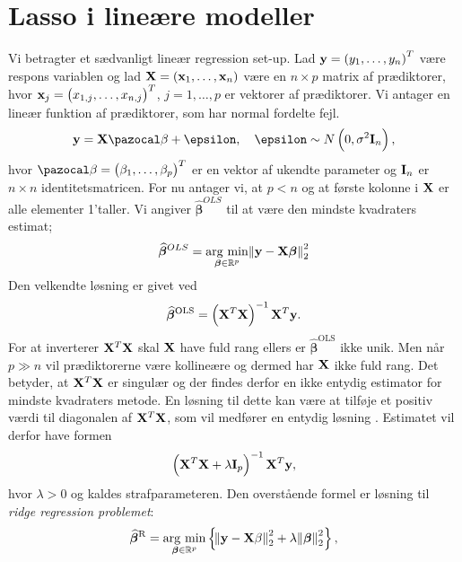 \chapter{Lasso i lineære modeller}
\citep{hastie}

Vi betragter et sædvanligt lineær regression set-up. Lad $\textbf{y} = \del{y_1, \dots, y_n}^T$ være respons variablen og lad $\textbf{X} = \del{\textbf{x}_1, \dots, \textbf{x}_n}$ være en $n \times p$ matrix af prædiktorer, hvor $\textbf{x}_j = \del{x_{1,j}, \dots, x_{n,j}}^T$, $j = 1, \dots, p$ er vektorer af prædiktorer. 
Vi antager en lineær funktion af prædiktorer, som har normal fordelte fejl. 
\begin{align*}
\textbf{y} = \textbf{X} \mathcal{\beta} + \epsilon, \quad \epsilon \sim N \del{0, \sigma^2 \text{\textbf{I}}_n},
\end{align*}
hvor $\mathcal{\beta} = \del{\beta_1, \dots, \beta_p}^T$ er en vektor af ukendte parameter og $\text{\textbf{I}}_n$ er $n \times n$ identitetsmatricen. 
For nu antager vi, at $p<n$ og at første kolonne i $\mathbf{X}$ er alle elementer 1'taller. 
Vi angiver $\widehat{\boldsymbol{\beta}}^{OLS}$ til at være den mindste kvadraters estimat;
\begin{align*}
\widehat{\boldsymbol{\beta}}^{OLS} = \underset{\boldsymbol\beta \in \mathbb{R}^p}{\operatorname*{\arg\,\min}} \norm{ \textbf{y} - \textbf{X}\boldsymbol\beta}^2_2
\end{align*}
Den velkendte løsning er givet ved 
\begin{align*}
\widehat{\boldsymbol\beta}^{\text{OLS}} = \del{\X^T \X}^{-1} \X^T \y.
\end{align*}
For at inverterer $\mathbf{X}^T \mathbf{X}$ skal $\mathbf{X}$ have fuld rang ellers er $\widehat{\boldsymbol\beta}^{\text{OLS}}$ ikke unik. 
Men når  \(p \gg n\) vil prædiktorerne være kollineære og dermed har \(\mathbf{X}\) ikke fuld rang.
Det betyder, at $\mathbf{X}^T \mathbf{X}$ er singulær og der findes derfor en ikke entydig estimator for mindste kvadraters metode.
En løsning til dette kan være at tilføje et positiv værdi til diagonalen af $\mathbf{X}^T \mathbf{X}$, som vil medfører en entydig løsning . 
Estimatet vil derfor have formen
\begin{align*}
 \del{\X^T \X + \lambda \text{\textbf{I}}_p}^{-1} \X^T \y,
\end{align*}
hvor $\lambda > 0$ og kaldes strafparameteren. Den overstående formel er løsning til \textit{ridge regression problemet}:
\begin{align}
 \widehat{\boldsymbol\beta}^{\text{R}} = \underset{\boldsymbol\beta \in \R^p}{\argmin}  \cbr{\norm{\y - \X\beta}^2_2 + \lambda \norm{\boldsymbol\beta}_2^2},
\end{align} \label{eq:2.8}
